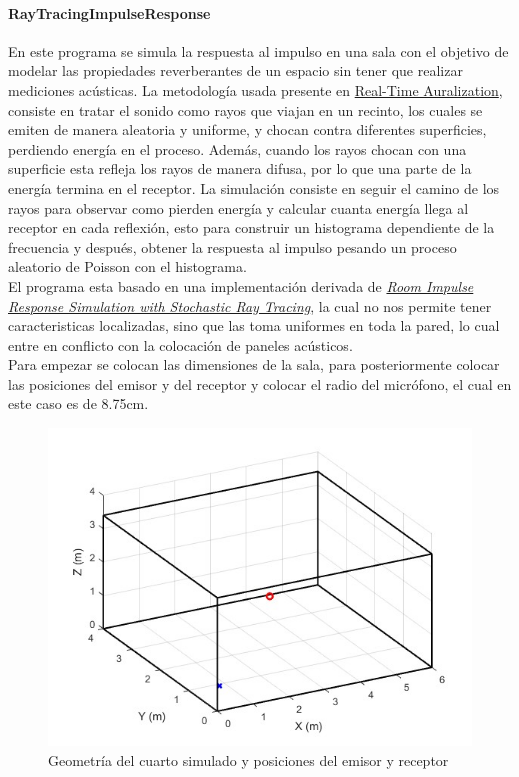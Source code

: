 \paragraph{RayTracingImpulseResponse}\hfill \break
En este programa se simula la respuesta al impulso en una sala con el objetivo de modelar las propiedades reverberantes de un espacio sin tener que realizar mediciones acústicas. La metodología usada presente en \href{http://publications.rwth-aachen.de/record/50580/files/3875.pdf}{Real-Time Auralization}, consiste en tratar el sonido como rayos que viajan en un recinto, los cuales se emiten de manera aleatoria y uniforme, y chocan contra diferentes superficies, perdiendo energía en el proceso. Además, cuando los rayos chocan con una superficie esta refleja los rayos de manera difusa, por lo que una parte de la energía termina en el receptor. La simulación consiste en seguir el camino de los rayos para observar como pierden energía y calcular cuanta energía llega al receptor en cada reflexión, esto para construir un histograma dependiente de la frecuencia y después, obtener la respuesta al impulso pesando un proceso aleatorio de Poisson con el histograma. \\
El programa esta basado en una implementación derivada de \href{https://www.mathworks.com/help/audio/ug/room-impulse-response-simulation-with-stochastic-ray-tracing.html}{\textit{Room Impulse Response Simulation with Stochastic Ray Tracing}}, la cual no nos permite tener caracteristicas localizadas, sino que las toma uniformes en toda la pared, lo cual entre en conflicto con la colocación de paneles acústicos. \\
Para empezar se colocan las dimensiones de la sala, para posteriormente colocar las posiciones del emisor y del receptor y colocar el radio del micrófono, el cual en este caso es de 8.75cm.\\
\begin{figure}[!htb]
    \centering
    \includegraphics[width=\linewidth]{imagenes/plotRoom.jpg}
    \caption{\footnotesize Geometría del cuarto simulado y posiciones del emisor y receptor}
    \label{fig:plotRoom}
\end{figure}
